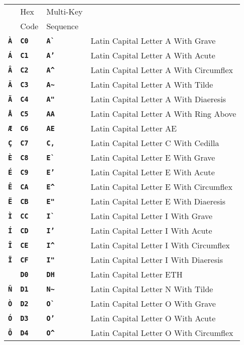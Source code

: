 \documentclass[12pt]{article}
\newcommand{\TT}[1]{{\tt \bfseries #1}}
\newlength{\figurewidth}
\newenvironment{boxedfigure}[1][!btp]%
	{\begin{figure*}[#1]
	 \begin{lrbox}{\figurebox}
	 \begin{minipage}{\figurewidth}

	 \vspace*{1ex}}%
	{
	 \vspace*{1ex}

	 \end{minipage}
	 \end{lrbox}

	 \vspace*{-15ex}
	 \centering
	 \fbox{\hspace*{0.1in}\usebox{\figurebox}\hspace*{0.1in}}
	 \end{figure*}}
\begin{document}
\begin{boxedfigure}[p]
\begin{tabular}{llll}
& Hex & Multi-Key \\
& Code & Sequence
\\[1ex]
\TT{\`A}
  & \TT{C0} & \TT{A\`~} & Latin Capital Letter A With Grave \\
\TT{\'A}
  & \TT{C1} & \TT{A'} & Latin Capital Letter A With Acute \\
\TT{\^A}
  & \TT{C2} & \TT{A\textasciicircum} & Latin Capital Letter A With Circumflex \\
\TT{\~A}
  & \TT{C3} & \TT{A\textasciitilde} & Latin Capital Letter A With Tilde \\
\TT{\"A}
  & \TT{C4} & \TT{A"} & Latin Capital Letter A With Diaeresis \\
\TT{\AA}
  & \TT{C5} & \TT{AA} & Latin Capital Letter A With Ring Above \\
\TT{\AE}
  & \TT{C6} & \TT{AE} & Latin Capital Letter AE \\
\TT{\c{C}}
  & \TT{C7} & \TT{C,} & Latin Capital Letter C With Cedilla \\
\TT{\`E}
  & \TT{C8} & \TT{E\`~} & Latin Capital Letter E With Grave \\
\TT{\'E}
  & \TT{C9} & \TT{E'} & Latin Capital Letter E With Acute \\
\TT{\^E}
  & \TT{CA} & \TT{E\textasciicircum} & Latin Capital Letter E With Circumflex \\
\TT{\"E}
  & \TT{CB} & \TT{E"} & Latin Capital Letter E With Diaeresis \\
\TT{\`I}
  & \TT{CC} & \TT{I\`~} & Latin Capital Letter I With Grave \\
\TT{\'I}
  & \TT{CD} & \TT{I'} & Latin Capital Letter I With Acute \\
\TT{\^I}
  & \TT{CE} & \TT{I\textasciicircum} & Latin Capital Letter I With Circumflex \\
\TT{\"I}
  & \TT{CF} & \TT{I"} & Latin Capital Letter I With Diaeresis \\
\TT{\DH}
  & \TT{D0} & \TT{DH} & Latin Capital Letter ETH \\
\TT{\~N}
  & \TT{D1} & \TT{N\textasciitilde} & Latin Capital Letter N With Tilde \\
\TT{\`O}
  & \TT{D2} & \TT{O\`~} & Latin Capital Letter O With Grave \\
\TT{\'O}
  & \TT{D3} & \TT{O'} & Latin Capital Letter O With Acute \\
\TT{\^O}
  & \TT{D4} & \TT{O\textasciicircum} & Latin Capital Letter O With Circumflex \\

\end{tabular}
\end{boxedfigure}
\end{document}
